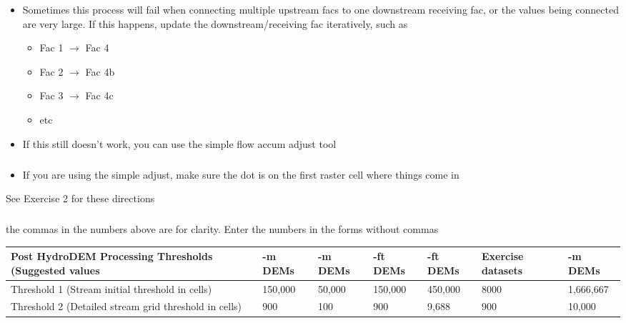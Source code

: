\documentclass[letterpaper,10pt,english]{sphinxmanual}
\begin{document}
\begin{itemize}
\item {} 
Sometimes this process will fail when connecting multiple upstream facs to one downstream receiving fac, or the values being connected are very large. If this happens, update the downstream/receiving fac iteratively, such as
\begin{itemize}
\item {} 
Fac 1 \(\rightarrow\) Fac 4

\item {} 
Fac 2 \(\rightarrow\) Fac 4b

\item {} 
Fac 3 \(\rightarrow\) Fac 4c

\item {} 
etc

\end{itemize}

\item {} 
If this still doesn’t work, you can use the simple flow accum adjust tool

\end{itemize}


\subparagraph{}
\label{\detokenize{ex_1:simple-flow-accum-adjust}}\begin{itemize}
\item {} 
If you are using the simple adjust, make sure the dot is on the first raster cell where things come in

\end{itemize}


See Exercise 2 for these directions


\subparagraph{}
\label{\detokenize{ex_1:streamstats-recommended-advanced-settings-and-thresholds}}
 the commas in the numbers above are for clarity. Enter the numbers in the forms without commas


\begin{savenotes}\sphinxattablestart
\centering
\begin{tabulary}{\linewidth}[t]{|T|T|T|T|T|T|T|}
\hline
\sphinxstyletheadfamily 
Post
HydroDEM
Processing
Thresholds
(Suggested
values
&-m
DEMs
&-m
DEMs
&-ft
DEMs
&-ft
DEMs
&\sphinxstyletheadfamily 
Exercise
datasets
&-m
DEMs
\\
\hline
Threshold 1
(Stream
initial
threshold in
cells)
&
150,000
&
50,000
&
150,000
&
450,000
&
8000
&
1,666,667
\\
\hline
Threshold 2
(Detailed
stream grid
threshold in
cells)
&
900
&
100
&
900
&
9,688
&
900
&
10,000
\\
\hline
\end{tabulary}
\par
\sphinxattableend\end{savenotes}
\end{document}
